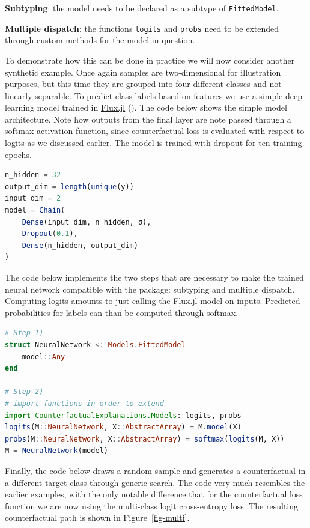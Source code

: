 \documentclass[
  letterpaper,
  DIV=11,
  numbers=noendperiod]{scrartcl}
\begin{document}
\begin{unnumlist}
\item \textbf{Subtyping}: the model needs to be declared as a subtype of \texttt{FittedModel}.
\item \textbf{Multiple dispatch}: the functions \texttt{logits} and \texttt{probs} need to be extended through custom methods for the model in question.
\end{unnumlist}

To demonstrate how this can be done in practice we will now consider
another synthetic example. Once again samples are two-dimensional for
illustration purposes, but this time they are grouped into four
different classes and not linearly separable. To predict class labels
based on features we use a simple deep-learning model trained in
\href{https://fluxml.ai/}{Flux.jl} (\cite{innes2018flux}). The code
below shows the simple model architecture. Note how outputs from the
final layer are note passed through a softmax activation function, since
counterfactual loss is evaluated with respect to logits as we discussed
earlier. The model is trained with dropout for ten training epochs.

\begin{lstlisting}[language = Julia]
n_hidden = 32
output_dim = length(unique(y))
input_dim = 2
model = Chain(
    Dense(input_dim, n_hidden, σ),
    Dropout(0.1),
    Dense(n_hidden, output_dim)
)  
\end{lstlisting}

The code below implements the two steps that are necessary to make the
trained neural network compatible with the package: subtyping and
multiple dispatch. Computing logits amounts to just calling the Flux.jl
model on inputs. Predicted probabilities for labels can than be computed
through softmax.

\begin{lstlisting}[language = Julia]
# Step 1)
struct NeuralNetwork <: Models.FittedModel
    model::Any
end

# Step 2)
# import functions in order to extend
import CounterfactualExplanations.Models: logits, probs 
logits(M::NeuralNetwork, X::AbstractArray) = M.model(X)
probs(M::NeuralNetwork, X::AbstractArray) = softmax(logits(M, X))
M = NeuralNetwork(model)
\end{lstlisting}

Finally, the code below draws a random sample and generates a
counterfactual in a different target class through generic search. The
code very much resembles the earlier examples, with the only notable
difference that for the counterfactual loss function we are now using
the multi-class logit cross-entropy loss. The resulting counterfactual
path is shown in Figure~\ref{fig-multi}.
\end{document}
